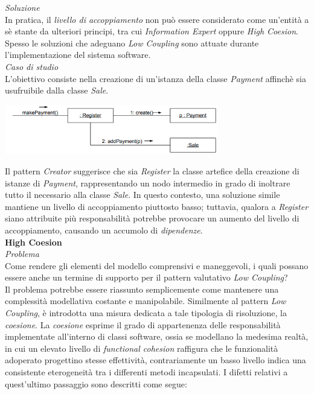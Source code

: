 \documentclass{article}
\begin{document}
\textit{Soluzione}\\
In pratica, il \textit{livello di accoppiamento} non può essere considerato come un'entità a sè stante da ulteriori principi, tra cui \textit{Information Expert} oppure \textit{High Coesion}. Spesso le soluzioni che adeguano \textit{Low Coupling} sono attuate durante l'implementazione del sistema software.\vspace*{14pt}\\
\textit{Caso di studio}\\
L'obiettivo consiste nella creazione di un'istanza della classe \textit{Payment} affinchè sia usufruibile dalla classe \textit{Sale}.\vspace*{7pt}
\begin{center}
    \includegraphics*[width=0.7\textwidth]{foto 3.png}
\end{center} 
Il pattern \textit{Creator} suggerisce che sia \textit{Register} la classe artefice della creazione di istanze di \textit{Payment}, rappresentando un nodo intermedio in grado di inoltrare tutto il necessario alla classe \textit{Sale}. In questo contesto, una soluzione simile mantiene un livello di accoppiamento piuttosto basso; tuttavia, qualora a \textit{Register} siano attribuite più responsabilità potrebbe provocare un aumento del livello di accoppiamento, causando un accumolo di \textit{dipendenze}.\vspace*{14pt}\\
\textbf{High Coesion}\vspace*{7pt}\\
\textit{Problema}\\
Come rendere gli elementi del modello comprensivi e maneggevoli, i quali possano essere anche un termine di supporto per il pattern valutativo \textit{Low Coupling}?\vspace*{14pt}\\
Il problema potrebbe essere riassunto semplicemente come mantenere una complessità modellativa costante e manipolabile. Similmente al pattern \textit{Low Coupling}, è introdotta una misura dedicata a tale tipologia di risoluzione, la \textit{coesione}. La \textit{coesione} esprime il grado di appartenenza delle responsabilità implementate all'interno di classi software, ossia se modellano la medesima realtà, in cui un elevato livello di \textit{functional cohesion} raffigura che le funzionalità adoperato progettino stesse effettività, contrariamente un basso livello indica una consistente eterogeneità tra i differenti metodi incapsulati. I difetti relativi a quest'ultimo passaggio sono descritti come segue:
\end{document}
